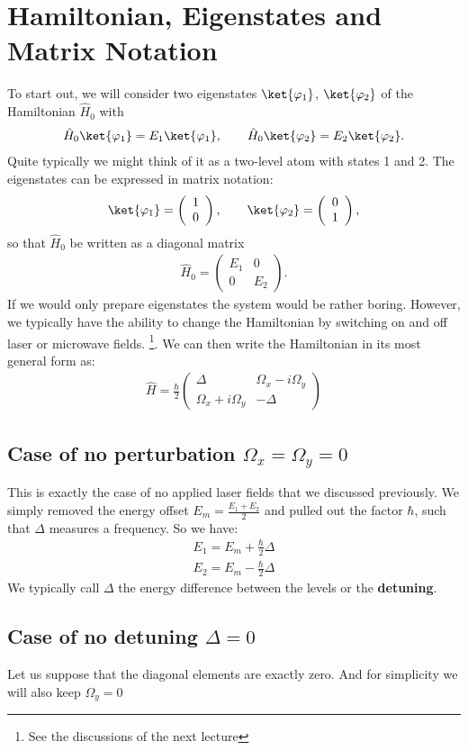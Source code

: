 \section{Hamiltonian, Eigenstates and Matrix Notation}

To start out, we will consider two eigenstates $\ket{\varphi_1}$, $\ket{\varphi_2}$ of the Hamiltonian $\hat{H}_0$ with
\begin{align}
 \hat{H}_0\ket{\varphi_1}=E_1\ket{\varphi_1}, \qquad \hat{H}_0\ket{\varphi_2}=E_2\ket{\varphi_2}.
\end{align}
Quite typically we might think of it as a two-level atom with states 1 and 2. The eigenstates can be expressed in matrix notation:
\begin{align}
 \ket{\varphi_1}=\left( \begin{array}{c} 1 \\ 0 \end{array} \right), \qquad \ket{\varphi_2}=\left( \begin{array}{c} 0 \\ 1 \end{array} \right),
\end{align}
so that $\hat{H}_0$ be written as a diagonal matrix
\begin{align}
    \hat{H}_0 = \left(\begin{array}{cc} E_1 & 0 \\ 0 & E_2 \end{array}\right).
\end{align}
If we would only prepare eigenstates the system would be rather boring. However, we typically have the ability to change the Hamiltonian by switching on and off laser or microwave fields. \footnote{See the discussions of the next lecture}. We can then write the Hamiltonian in its most general form as:
\begin{align}
\hat{H} = \frac{\hbar}{2}\left( \begin{array}{cc} \Delta  & \Omega_x - i\Omega_y\\ \Omega_x +i\Omega_y & -\Delta \end{array} \right)
\end{align}

\subsection{Case of no perturbation $\Omega_x = \Omega_y = 0$}

This is exactly the case of no applied laser fields that we discussed previously. We simply removed the energy offset $E_m = \frac{E_1+E_2}{2}$ and pulled out the factor $\hbar$, such that $\Delta$ measures a frequency. So we have:
\begin{align}
E_1 = E_m+ \frac{\hbar}{2}\Delta\\
E_2 = E_m- \frac{\hbar}{2}\Delta
\end{align}
We typically call $\Delta$ the energy difference between the levels or the \textbf{detuning}.

\subsection{Case of no detuning $\Delta = 0$}

Let us suppose that the diagonal elements are exactly zero. And for simplicity we will also keep $\Omega_y =0$
